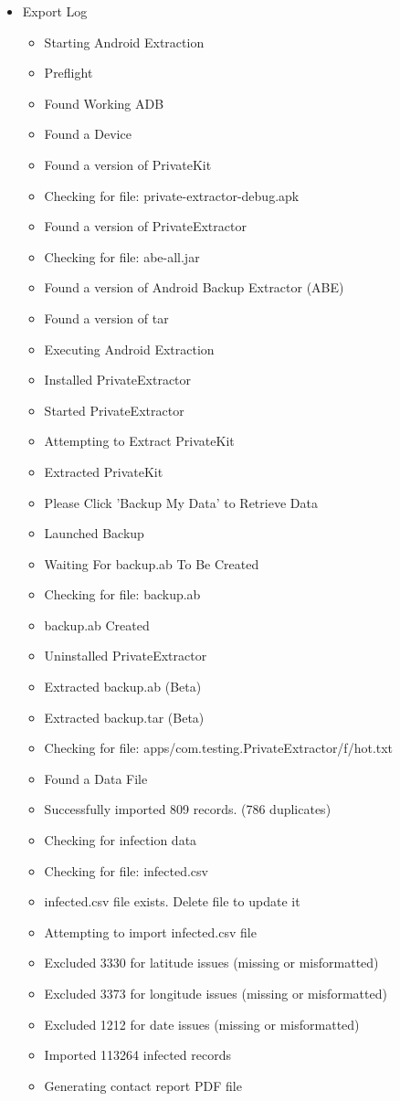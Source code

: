 \documentclass{article}
\begin{document}
\begin{itemize}
   \item  Export Log
   \begin{itemize}
			\item	{Starting Android Extraction}
			\item	{Preflight}
			\item	{Found Working ADB}
			\item	{Found a Device}
			\item	{Found a version of PrivateKit}
			\item	{Checking for file: private-extractor-debug.apk}
			\item	{Found a version of PrivateExtractor}
			\item	{Checking for file: abe-all.jar}
			\item	{Found a version of Android Backup Extractor (ABE)}
			\item	{Found a version of tar}
			\item	{Executing Android Extraction}
			\item	{Installed PrivateExtractor}
			\item	{Started PrivateExtractor}
			\item	{Attempting to Extract PrivateKit}
			\item	{Extracted PrivateKit}
			\item	{Please Click 'Backup My Data' to Retrieve Data}
			\item	{Launched Backup}
			\item	{Waiting For backup.ab To Be Created}
			\item	{Checking for file: backup.ab}
			\item	{backup.ab Created}
			\item	{Uninstalled PrivateExtractor}
			\item	{Extracted backup.ab (Beta)}
			\item	{Extracted backup.tar (Beta)}
			\item	{Checking for file: apps/com.testing.PrivateExtractor/f/hot.txt}
			\item	{Found a Data File}
			\item	{Successfully imported 809 records. (786 duplicates)}
			\item	{Checking for infection data}
			\item	{Checking for file: infected.csv}
			\item	{infected.csv file exists. Delete file to update it}
			\item	{Attempting to import infected.csv file}
			\item	{Excluded 3330 for latitude issues (missing or misformatted)}
			\item	{Excluded 3373 for longitude issues (missing or misformatted)}
			\item	{Excluded 1212 for date issues (missing or misformatted)}
			\item	{Imported 113264 infected records}
			\item	{Generating contact report PDF file}
		\end{itemize}
\end{itemize}
\end{document}
